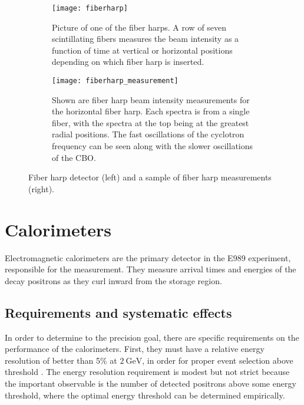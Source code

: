 \begin{figure}
\centering
    \begin{subfigure}[]{0.45\textwidth}
        \centering
        \vspace{-11mm}
        \texttt{[image: fiberharp]}
        \vspace{2mm}
        \caption{Picture of one of the fiber harps. A row of seven scintillating fibers measures the beam intensity as a function of time at vertical or horizontal positions depending on which fiber harp is inserted.}
    \label{fig:fiberharp}
    \end{subfigure}%
    \hspace{10mm}
    \begin{subfigure}[]{0.45\textwidth}
        \centering
        \texttt{[image: fiberharp\_measurement]}
        \vspace{-3mm}
        \caption{Shown are fiber harp beam intensity measurements for the horizontal fiber harp. Each spectra is from a single fiber, with the spectra at the top being at the greatest radial positions. The fast oscillations of the cyclotron frequency can be seen along with the slower oscillations of the CBO.}
    \label{fig:fiberharp_measurement}
    \end{subfigure}
\caption[Fiber harp and measurement]{Fiber harp detector (left) and a sample of fiber harp measurements (right).}
\label{fig:fiberharppics}
\end{figure}





\section{Calorimeters}
\label{sec:Calorimeters}


Electromagnetic calorimeters are the primary detector in the E989 experiment, responsible for the \wa measurement. They measure arrival times and energies of the decay positrons as they curl inward from the storage region. 

\subsection{Requirements and systematic effects}
\label{sub:calosystematics}

In order to determine \wa to the precision goal, there are specific requirements on the performance of the calorimeters. First, they must have a relative energy resolution of better than 5\% at $\SI{2}{\GeV}$, in order for proper event selection above threshold \cite{TDR}. The energy resolution requirement is modest but not strict because the important observable is the number of detected positrons above some energy threshold, where the optimal energy threshold can be determined empirically.


